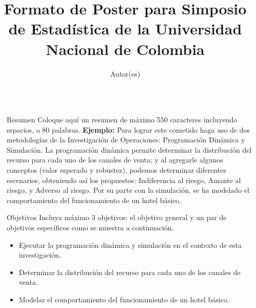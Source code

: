 \documentclass[final]{beamer}
\title{Formato de Poster para Simposio de Estadística de la Universidad Nacional de Colombia} %
\author{{\Large Autor(es)}} %
\institute{{\Large Institución(es)}} %
\newlength{\sepwid}
\newlength{\onecolwid}
\begin{document}
    


\setlength{\belowcaptionskip}{1ex} %
\setlength\belowdisplayshortskip{1ex} %

\begin{frame}[t] %

\begin{columns}[t] %

\begin{column}{\sepwid}\end{column} 

\begin{column}{\onecolwid} %


\begin{alertblock}{Resumen}
	Coloque aquí un resumen de máximo 550 caracteres incluyendo espacios, o 80 palabras. \textbf{Ejemplo:} Para lograr este cometido haga uso de dos metodologías de la Investigación de Operaciones: Programación Dinámica y Simulación. La programación dinámica permite determinar la distribución del recurso para cada uno de los canales de venta; y al agregarle algunos conceptos (valor esperado y robustez), podemos determinar diferentes escenarios, obteniendo así los propuestos: Indiferencia al riesgo, Amante al riesgo, y Adverso al riesgo. Por su parte con la simulación, se ha modelado el comportamiento del funcionamiento de un hotel básico.
\end{alertblock}


\begin{block}{Objetivos}
Incluya máximo 3 objetivos: el objetivo general y un par de objetivos específicos como se muestra a continuación.
\begin{itemize}
    \item Ejecutar la programación dinámica y simulación en el contexto de esta investigación.
    \item Determinar la distribución del recurso para cada uno de los canales de venta.
    \item Modelar el comportamiento del funcionamiento de un hotel básico.
\end{itemize}    


\end{block}
\end{column}
\end{columns}
\end{frame}
\end{document}
